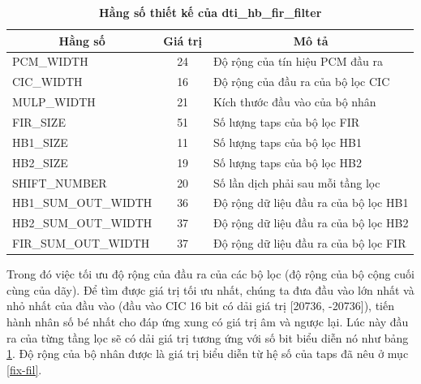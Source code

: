 \begin{table}[H]
    \centering
    \caption[Hằng số thiết kế của dti\_hb\_fir\_filter]{\bfseries\fontsize{12pt}{0pt}\selectfont Hằng số thiết kế của dti\_hb\_fir\_filter}
\begin{tabular}{|l|c|l|}
\hline
\multicolumn{1}{|c|}{\textbf{Hằng số}} & \textbf{Giá trị} & \multicolumn{1}{c|}{\textbf{Mô tả}} \\ \hline
PCM\_WIDTH  & 24 & Độ rộng của tín hiệu PCM đầu ra \\ \hline
CIC\_WIDTH  & 16 & Độ rộng của đầu ra của bộ lọc CIC \\ \hline
MULP\_WIDTH & 21 & Kích thước đầu vào của bộ nhân \\ \hline
FIR\_SIZE   & 51 & Số lượng taps của bộ lọc FIR    \\ \hline
HB1\_SIZE   & 11 & Số lượng taps của bộ lọc HB1    \\ \hline
HB2\_SIZE   & 19 & Số lượng taps của bộ lọc HB2    \\ \hline
SHIFT\_NUMBER   & 20 & Số lần dịch phải sau mỗi tầng lọc    \\ \hline
HB1\_SUM\_OUT\_WIDTH   & 36 & Độ rộng dữ liệu đầu ra của bộ lọc HB1    \\ \hline
HB2\_SUM\_OUT\_WIDTH   & 37 & Độ rộng dữ liệu đầu ra của bộ lọc HB2    \\ \hline
FIR\_SUM\_OUT\_WIDTH   & 37 & Độ rộng dữ liệu đầu ra của bộ lọc FIR    \\ \hline
\end{tabular}
    \label{hangso_hb_fir}
\end{table}

Trong đó việc tối ưu độ rộng của đầu ra của các bộ lọc (độ rộng của bộ cộng cuối cùng của dãy). Để tìm được giá trị tối ưu nhất, chúng ta đưa đầu vào lớn nhất và nhỏ nhất của đầu vào (đầu vào CIC 16 bit có dải giá trị [20736, -20736]), tiến hành nhân số bé nhất cho đáp ứng xung có giá trị âm và ngược lại. Lúc này đầu ra của từng tầng lọc sẽ có dải giá trị tương ứng với số bit biểu diễn nó như bảng \ref{hangso_hb_fir}. Độ rộng của bộ nhân được là giá trị biểu diễn từ hệ số của taps đã nêu ở mục \ref{fix-fil}.

